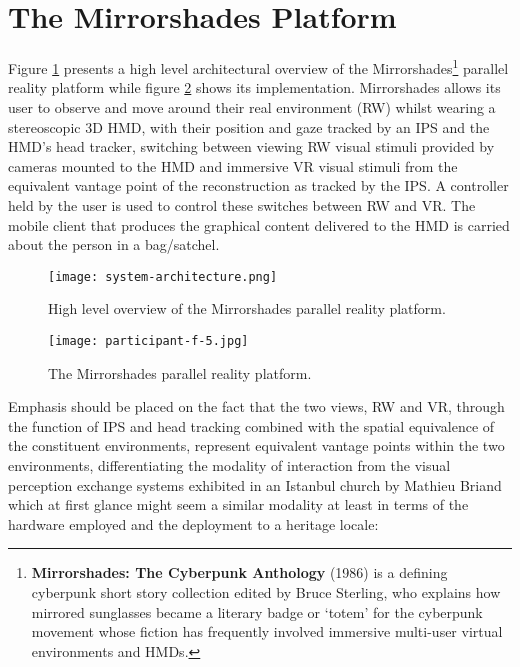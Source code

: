 
\section{The Mirrorshades Platform}
\label{the-mirrorshades-platform}
Figure \ref{systemarchitecture} presents a high level architectural overview of the Mirrorshades\footnote{\textbf{Mirrorshades: The Cyberpunk Anthology} (1986) is a defining cyberpunk short story collection edited by Bruce Sterling, who explains how mirrored sunglasses became a literary badge or `totem' for the cyberpunk movement whose fiction has frequently involved immersive multi-user virtual environments and HMDs.} parallel reality platform while figure \ref{participant-f-5.jpg} shows its implementation. Mirrorshades allows its user to observe and move around their real environment (RW) whilst wearing a stereoscopic 3D HMD, with their position and gaze tracked by an IPS and the HMD's head tracker, switching between viewing RW visual stimuli provided by cameras mounted to the HMD and immersive VR visual stimuli from the equivalent vantage point of the reconstruction as tracked by the IPS. A controller held by the user is used to control these switches between RW and VR. The mobile client that produces the graphical content delivered to the HMD is carried about the person in a bag/satchel.

\begin{figure}[h]
	\begin{center}
		\texttt{[image: system-architecture.png]}
		\caption{High level overview of the Mirrorshades parallel reality platform.}
		\label{systemarchitecture}
	\end{center}
\end{figure}

\begin{figure}[h]
	\begin{center}
		\texttt{[image: participant-f-5.jpg]}
		\caption{The Mirrorshades parallel reality platform.}
		\label{participant-f-5.jpg}
	\end{center}
\end{figure}

Emphasis should be placed on the fact that the two views, RW and VR, through the function of IPS and head tracking combined with the spatial equivalence of the constituent environments, represent equivalent vantage points within the two environments, differentiating the modality of interaction from the visual perception exchange systems exhibited in an Istanbul church by Mathieu Briand which at first glance might seem a similar modality at least in terms of the hardware employed and the deployment to a heritage locale:

